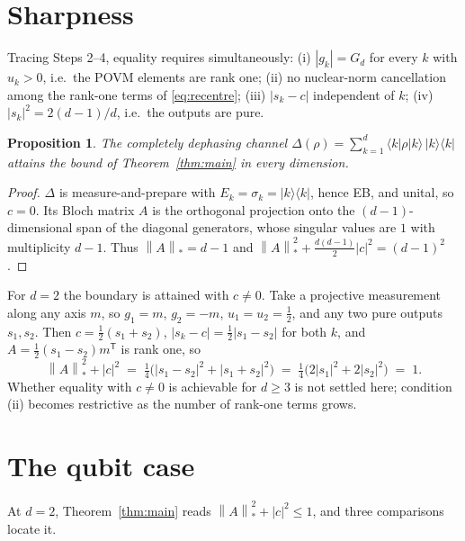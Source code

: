 \documentclass[11pt,a4paper]{article}
\newtheorem{proposition}[theorem]{Proposition}
\theoremstyle{remark}
\newcommand{\nuc}[1]{\left\lVert #1 \right\rVert_{*}}
\begin{document}
\section{Sharpness}

Tracing Steps 2--4, equality requires simultaneously: (i) $|g_k|=G_d$ for every $k$ with $u_k>0$, i.e.\ the POVM elements are rank one; (ii) no nuclear-norm cancellation among the rank-one terms of \eqref{eq:recentre}; (iii) $|s_k-c|$ independent of $k$; (iv) $|s_k|^2 = 2(d-1)/d$, i.e.\ the outputs are pure.

\begin{proposition}\label{prop:dephasing}
The completely dephasing channel $\Delta(\rho)=\sum_{k=1}^d \langle k|\rho|k\rangle\,|k\rangle\!\langle k|$ attains the bound of Theorem~\ref{thm:main} in every dimension.
\end{proposition}

\begin{proof}
$\Delta$ is measure-and-prepare with $E_k=\sigma_k=|k\rangle\!\langle k|$, hence EB, and unital, so $c=0$. Its Bloch matrix $A$ is the orthogonal projection onto the $(d-1)$-dimensional span of the diagonal generators, whose singular values are $1$ with multiplicity $d-1$. Thus $\nuc{A}=d-1$ and $\nuc{A}^2+\tfrac{d(d-1)}{2}|c|^2=(d-1)^2$.
\end{proof}

For $d=2$ the boundary is attained with $c\neq0$. Take a projective measurement along any axis $m$, so $g_1=m$, $g_2=-m$, $u_1=u_2=\tfrac12$, and any two pure outputs $s_1,s_2$. Then $c=\tfrac12(s_1+s_2)$, $|s_k-c|=\tfrac12|s_1-s_2|$ for both $k$, and $A=\tfrac12(s_1-s_2)m^{\mathsf T}$ is rank one, so
\[
\nuc{A}^2+|c|^2 \;=\; \tfrac14\big(|s_1-s_2|^2+|s_1+s_2|^2\big) \;=\; \tfrac14\big(2|s_1|^2+2|s_2|^2\big) \;=\; 1 .
\]
Whether equality with $c\neq0$ is achievable for $d\ge3$ is not settled here; condition (ii) becomes restrictive as the number of rank-one terms grows.

\section{The qubit case}
\label{sec:qubit}

At $d=2$, Theorem~\ref{thm:main} reads $\nuc{A}^2+|c|^2\le1$, and three comparisons locate it.
\end{document}
